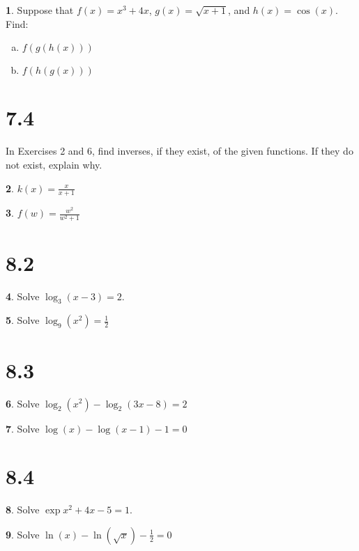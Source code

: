 \documentclass[12pt]{book}
\theoremstyle{definition}
\newtheorem{thm}{}
\begin{document}
\setcounter{thm}{3}
\begin{thm}
  Suppose that $f(x) = x^3 + 4x$, $g(x) = \sqrt{x + 1}$, and $h(x) = \cos(x)$.
  Find: 
  \begin{enumerate}[(a)]
  \item
    $\displaystyle{f(g(h(x)))}$
  \item
    $\displaystyle{f(h(g(x)))}$
  \end{enumerate}
\end{thm}

\section*{7.4}

In Exercises 2 and 6, find inverses, if they exist, of the given functions.  If they do not exist, explain why.
\setcounter{thm}{1}

\begin{thm}
  $\displaystyle{k(x) = \frac{x}{x+1}}$
\end{thm}

\setcounter{thm}{5}
\begin{thm}
  $f(w) = \displaystyle{\frac{w^2}{w^2 + 1}}$
\end{thm}

\section*{8.2}

\setcounter{thm}{5}
\begin{thm}
  Solve $\displaystyle{\log_3(x - 3) = 2}$.
\end{thm}

\setcounter{thm}{7}
\begin{thm}
  Solve $\displaystyle{\log_9(x^2) = \frac{1}{2}}$
\end{thm}

\section*{8.3}

\setcounter{thm}{5}
\begin{thm}
  Solve $\displaystyle{\log_2(x^2) - \log_2(3x - 8) = 2}$
\end{thm}

\setcounter{thm}{9}
\begin{thm}
  Solve $\displaystyle{\log(x) - \log(x-1) - 1 = 0}$
\end{thm}

\section*{8.4}

\setcounter{thm}{7}
\begin{thm}
  Solve $\displaystyle{\exp{x^2 + 4x - 5} = 1}$.
\end{thm}

\setcounter{thm}{13}
\begin{thm}
  Solve $\displaystyle{\ln(x) - \ln(\sqrt{x}) - \frac{1}{2} = 0}$
\end{thm}
\end{document}
